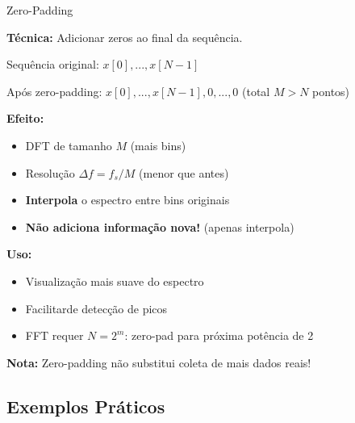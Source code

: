 \begin{frame}{Zero-Padding}

\textbf{Técnica:} Adicionar zeros ao final da sequência.

Sequência original: $x[0], ..., x[N-1]$

Após zero-padding: $x[0], ..., x[N-1], 0, ..., 0$ (total $M > N$ pontos)

\vspace{0.1cm}

\textbf{Efeito:}

\begin{itemize}
\item DFT de tamanho $M$ (mais bins)
\item Resolução $\Delta f = f_s/M$ (menor que antes)
\item \textbf{Interpola} o espectro entre bins originais
\item \textbf{Não adiciona informação nova!} (apenas interpola)
\end{itemize}

\vspace{0.1cm}

\textbf{Uso:}

\begin{itemize}
\item Visualização mais suave do espectro
\item Facilitarde detecção de picos
\item FFT requer $N = 2^m$: zero-pad para próxima potência de 2
\end{itemize}

\textbf{Nota:} Zero-padding não substitui coleta de mais dados reais!

\end{frame}


\subsection{Exemplos Práticos}

